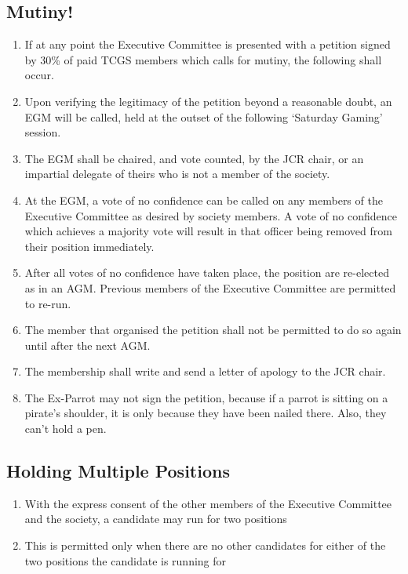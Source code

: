 \documentclass[hidelinks, 12pt, a4paper]{article}
\begin{document}
\subsection{Mutiny!}
\begin{enumerate}
	\item If at any point the Executive Committee is presented with a petition signed by 30\% of paid TCGS members which calls for mutiny, the following shall occur.
	\item Upon verifying the legitimacy of the petition beyond a reasonable doubt, an EGM will be called, held at the outset of the following ‘Saturday Gaming’ session.
	\item The EGM shall be chaired, and vote counted, by the JCR chair, or an impartial delegate of theirs who is not a member of the society.
	\item At the EGM, a vote of no confidence can be called on any members of the Executive Committee as desired by society members. A vote of no confidence which achieves a majority vote will result in that officer being removed from their position immediately.
	\item After all votes of no confidence have taken place, the position are re-elected as in an AGM. Previous members of the Executive Committee are permitted to re-run.
	\item The member that organised the petition shall not be permitted to do so again until after the next AGM.
	\item The membership shall write and send a letter of apology to the JCR chair.
	\item The Ex-Parrot may not sign the petition, because if a parrot is sitting on a pirate’s shoulder, it is only because they have been nailed there. Also, they can’t hold a pen.
\end{enumerate}

\subsection{Holding Multiple Positions}
\begin{enumerate}
	\item With the express consent of the other members of the Executive Committee and the society, a candidate may run for two positions
	\item This is permitted only when there are no other candidates for either of the two positions the candidate is running for
\end{enumerate}
\end{document}
